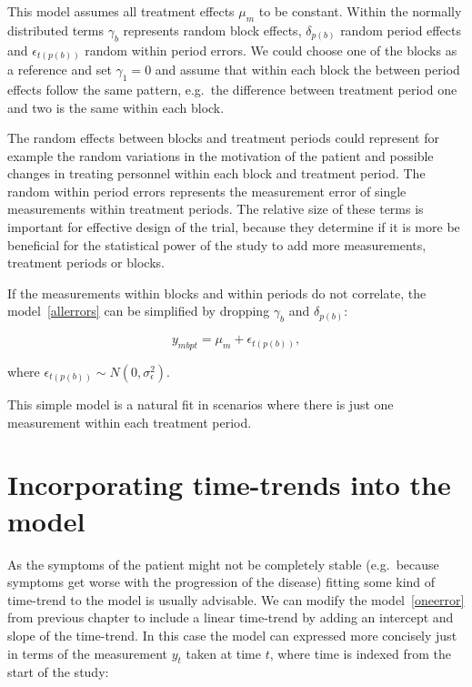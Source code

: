 \documentclass[12pt,a4paper,leqno]{report}
\theoremstyle{plain}
\theoremstyle{definition}
\theoremstyle{remark}
\begin{document}
This model assumes all treatment effects \(\mu_m\) to be constant. Within the
normally distributed terms \(\gamma_b\) represents random block effects,
\(\delta_{p(b)}\) random period effects and \(\epsilon_{t(p(b))}\) random within
period errors. We could choose one of the blocks as a reference and set
\(\gamma_1 = 0\) and assume that within each block the between period effects
follow the same pattern, e.g.\ the difference between treatment period one and
two is the same within each block.

The random effects between blocks and treatment periods could represent for
example the random variations in the motivation of the patient and possible
changes in treating personnel within each block and treatment period. The random
within period errors represents the measurement error of single measurements
within treatment periods. The relative size of these terms is important
for effective design of the trial, because they determine if it is more be
beneficial for the statistical power of the study to add more measurements,
treatment periods or blocks.

If the measurements within blocks and within periods do not correlate, the
model\ \ref{allerrors} can be simplified by dropping \(\gamma_b\) and
\(\delta_{p(b)}\):

\begin{def}\label{}
    \begin{equation}\label{oneerror}
        y_{mbpt} = \mu_m + \epsilon_{t(p(b))},
    \end{equation}
\end{def}where \(\epsilon_{t(p(b))} \sim N(0,\sigma^2_{\epsilon})\).

This simple model is a natural fit in scenarios where there is just one
measurement within each treatment period.

\section{Incorporating time-trends into the model}\label{timetrends}

As the symptoms of the patient might not be completely stable (e.g.\ because
symptoms get worse with the progression of the disease) fitting some kind of
time-trend to the model is usually advisable. We can modify the model\ \ref{oneerror} from previous chapter to include a linear time-trend by adding an
intercept and slope of the time-trend. In this case the model can expressed more
concisely just in terms of the measurement \(y_t\) taken at time \(t\), where
time is indexed from the start of the study:
\end{document}
